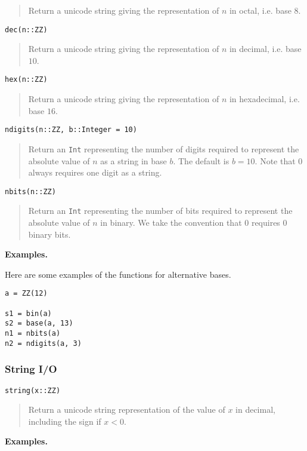 \documentclass[a4paper,10pt]{article}
\newcommand{\code}{\lstinline}
\newcommand{\desc}[1]{\vspace{-3mm}\begin{quote}#1\end{quote}}
\begin{document}
{{{\desc{Return a unicode string giving the representation of $n$ in octal, i.e. base $8$.}

\begin{lstlisting}
dec(n::ZZ)
\end{lstlisting}

\desc{Return a unicode string giving the representation of $n$ in decimal, i.e. base $10$.}

\begin{lstlisting}
hex(n::ZZ)
\end{lstlisting}

\desc{Return a unicode string giving the representation of $n$ in hexadecimal, i.e. base $16$.}

\begin{lstlisting}
ndigits(n::ZZ, b::Integer = 10)
\end{lstlisting}

\desc{Return an \code{Int} representing the number of digits required to represent the
absolute value of $n$ as a string in base $b$. The default is $b = 10$. Note that $0$
always requires one digit as a string.}

\begin{lstlisting}
nbits(n::ZZ)
\end{lstlisting}

\desc{Return an \code{Int} representing the number of bits required to represent the
absolute value of $n$ in binary. We take the convention that $0$ requires $0$ binary 
bits.}

\textbf{Examples.}

Here are some examples of the functions for alternative bases.

\begin{lstlisting}
a = ZZ(12)

s1 = bin(a)
s2 = base(a, 13)
n1 = nbits(a)
n2 = ndigits(a, 3)
\end{lstlisting}

\subsubsection{String I/O}

\begin{lstlisting}
string(x::ZZ)
\end{lstlisting}

\desc{Return a unicode string representation of the value of $x$ in decimal, including the sign
if $x < 0$.}

\textbf{Examples.}

}}}
\end{document}
